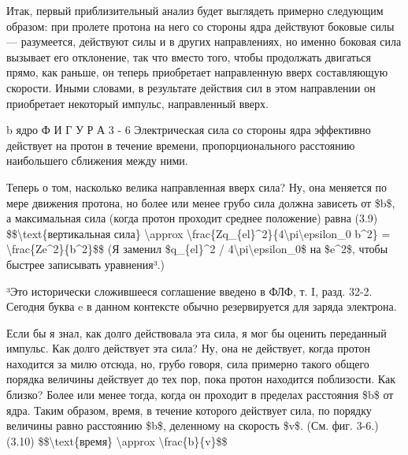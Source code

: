 \documentclass[10pt,oneside]{article}
\newcommand{\TipsRunning}[1]{\par\vspace{2bp}{\centering\footnotesize #1\par}\vspace{2bp}}
\begin{document}
Итак, первый приблизительный анализ будет выглядеть примерно следующим образом: при пролете протона на него со стороны ядра действуют боковые силы --- разумеется, действуют силы и в других направлениях, но именно боковая сила вызывает его отклонение, так что вместо того, чтобы продолжать двигаться прямо, как раньше, он теперь приобретает направленную вверх составляющую скорости. Иными словами, в результате действия сил в этом направлении он приобретает некоторый импульс, направленный вверх.\par

\TipsRunning{З А Д А Ч И  И  И Х  Р Е Ш Е Н И Я \textbackslash{}textbullet\{\} 9 7}

b ядро Ф И Г У Р А  3 - 6 Электрическая сила со стороны ядра эффективно действует на протон в течение времени, пропорционального расстоянию наибольшего сближения между ними.\par

Теперь о том, насколько велика направленная вверх сила? Ну, она меняется по мере движения протона, но более или менее грубо сила должна зависеть от \$b\$, а максимальная сила (когда протон проходит среднее положение) равна (3.9) \$\$\textbackslash{}text\{вертикальная сила\} \textbackslash{}approx \textbackslash{}frac\{Zq\_\{el\}\textasciicircum{}2\}\{4\textbackslash{}pi\textbackslash{}epsilon\_0 b\textasciicircum{}2\} = \textbackslash{}frac\{Ze\textasciicircum{}2\}\{b\textasciicircum{}2\}\$\$ (Я заменил \$q\_\{el\}\textasciicircum{}2 / 4\textbackslash{}pi\textbackslash{}epsilon\_0\$ на \$e\textasciicircum{}2\$, чтобы быстрее записывать уравнения³.)\par

³Это исторически сложившееся соглашение введено в ФЛФ, т. I, разд. 32-2. Сегодня буква e в данном контексте обычно резервируется для заряда электрона.\par

Если бы я знал, как долго действовала эта сила, я мог бы оценить переданный импульс. Как долго действует эта сила? Ну, она не действует, когда протон находится за милю отсюда, но, грубо говоря, сила примерно такого общего порядка величины действует до тех пор, пока протон находится поблизости. Как близко? Более или менее тогда, когда он проходит в пределах расстояния \$b\$ от ядра. Таким образом, время, в течение которого действует сила, по порядку величины равно расстоянию \$b\$, деленному на скорость \$v\$. (См. фиг. 3-6.) (3.10) \$\$\textbackslash{}text\{время\} \textbackslash{}approx \textbackslash{}frac\{b\}\{v\}\$\$\par
\end{document}
